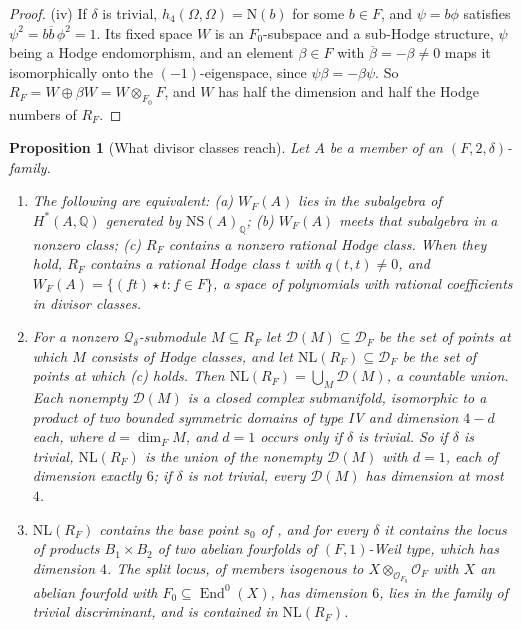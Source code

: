 \documentclass[11pt,reqno]{amsart}
\theoremstyle{plain}
\newtheorem{proposition}[theorem]{Proposition}
\theoremstyle{definition}
\theoremstyle{remark}
\newcommand{\QQ}{\mathbb{Q}}
\newcommand{\cO}{\mathcal{O}}
\newcommand{\cD}{\mathcal{D}}
\newcommand{\cQ}{\mathcal{Q}}
\newcommand{\NS}{\mathrm{NS}}
\newcommand{\Nm}{\mathrm{N}}             %
\DeclareMathOperator{\End}{End}
\newcommand{\bbar}[1]{\overline{#1}}
\begin{document}
\begin{proof}
(iv) If $\delta$ is trivial, $h_{4}(\Omega,\Omega)=\Nm(b)$ for some $b\in F$,
and $\psi=b\phi$ satisfies $\psi^{2}=b\bbar b\,\phi^{2}=1$. Its fixed space
$W$ is an $F_{0}$-subspace and a sub-Hodge structure, $\psi$ being a Hodge
endomorphism, and an element $\beta\in F$ with $\bbar\beta=-\beta\ne0$ maps it
isomorphically onto the $(-1)$-eigenspace, since $\psi\beta=-\beta\psi$. So
$R_{F}=W\oplus\beta W=W\otimes_{F_{0}}F$, and $W$ has half the dimension and
half the Hodge numbers of $R_{F}$.
\end{proof}

\begin{proposition}[What divisor classes reach]\label{prop:quarticnl}
Let $A$ be a member of an $(F,2,\delta)$-family.
\begin{enumerate}[label=\textup{(\roman*)},leftmargin=2.6em,itemsep=2pt]
\item The following are equivalent: \textup{(a)} $W_{F}(A)$ lies in the
  subalgebra of $H^{*}(A,\QQ)$ generated by $\NS(A)_{\QQ}$; \textup{(b)}
  $W_{F}(A)$ meets that subalgebra in a nonzero class; \textup{(c)} $R_{F}$
  contains a nonzero rational Hodge class. When they hold, $R_{F}$ contains a
  rational Hodge class $t$ with $q(t,t)\ne0$, and
  $W_{F}(A)=\{(ft)\star t:f\in F\}$, a space of polynomials with rational
  coefficients in divisor classes.
\item For a nonzero $\cQ_{\delta}$-submodule $M\subseteq R_{F}$ let
  $\cD(M)\subseteq\cD_{F}$ be the set of points at which $M$ consists of Hodge
  classes, and let $\mathrm{NL}(R_{F})\subseteq\cD_{F}$ be the set of points at
  which \textup{(c)} holds. Then $\mathrm{NL}(R_{F})=\bigcup_{M}\cD(M)$, a
  countable union. Each nonempty $\cD(M)$ is a closed complex submanifold,
  isomorphic to a product of two bounded symmetric domains of type IV and
  dimension $4-d$ each, where $d=\dim_{F}M$, and $d=1$ occurs only if $\delta$ is
  trivial. So if $\delta$ is trivial, $\mathrm{NL}(R_{F})$ is the union of the
  nonempty $\cD(M)$ with $d=1$, each of dimension exactly $6$; if $\delta$ is
  not trivial, every $\cD(M)$ has dimension at most $4$.
\item $\mathrm{NL}(R_{F})$ contains the base point $s_{0}$ of
  \cite[Theorem~17.5]{paperI}, and for every $\delta$ it contains the locus of
  products $B_{1}\times B_{2}$ of two abelian fourfolds of $(F,1)$-Weil type,
  which has dimension $4$. The split locus, of members isogenous to
  $X\otimes_{\cO_{F_{0}}}\cO_{F}$ with $X$ an abelian fourfold with
  $F_{0}\subseteq\End^{0}(X)$, has dimension $6$, lies in the family of
  trivial discriminant, and is contained in $\mathrm{NL}(R_{F})$.
\end{enumerate}
\end{proposition}
\end{document}
